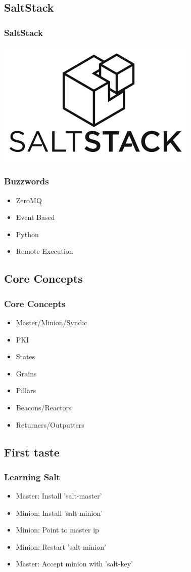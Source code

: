 \subsection{SaltStack}
\frame
{
  \frametitle{SaltStack}

  \begin{center}%
    \includegraphics[height=6cm]{images/saltstack_logo.jpg}
  \end{center}%
}

\frame
{
  \frametitle{Buzzwords}
  \begin{itemize}
  \item<1-> ZeroMQ
  \item<2-> Event Based
  \item<3-> Python
  \item<4-> Remote Execution
  \end{itemize}
}

\subsection{Core Concepts}
\frame
{
  \frametitle{Core Concepts}
  \begin{itemize}
  \item<1-> Master/Minion/Syndic
  \item<2-> PKI
  \item<3-> States
  \item<4-> Grains
  \item<5-> Pillars
  \item<6-> Beacons/Reactors
  \item<7-> Returners/Outputters
  \end{itemize}
}

\subsection{First taste}
\frame
{
  \frametitle{Learning Salt}
  \begin{itemize}
  \item<1-> Master: Install 'salt-master'
  \item<2-> Minion: Install 'salt-minion'
  \item<3-> Minion: Point to master ip
  \item<4-> Minion: Restart 'salt-minion'
  \item<5-> Master: Accept minion with 'salt-key'
  \end{itemize}
}

